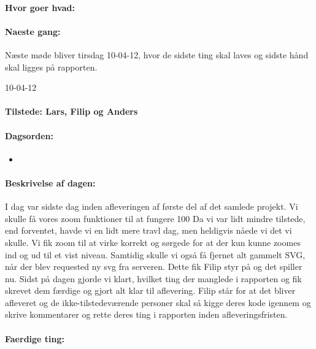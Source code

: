 \documentclass[a4paper,10pt,titlepage]{article}
\begin{document}
		\paragraph{Hvor goer hvad:}
		
		\paragraph{Naeste gang:}
		Næste møde bliver tirsdag 10-04-12, hvor de sidste ting skal laves og sidste hånd skal ligges på rapporten. \mbox{}\\ 
		
		\begin{center}
		10-04-12
		\end{center}
		
		\paragraph{Tilstede: Lars, Filip og Anders}
		\paragraph{Dagsorden:}
		\begin{itemize}
					\item 
					 
		\end{itemize}
		
		\paragraph{Beskrivelse af dagen:}
		I dag var sidste dag inden afleveringen af første del af det samlede projekt. Vi skulle få vores zoom funktioner til at fungere 100%
Da vi var lidt mindre tilstede, end forventet, havde vi en lidt mere travl dag, men heldigvis nåede vi det vi skulle. Vi fik zoom til at virke korrekt og sørgede for at der kun kunne zoomes ind og ud til et vist niveau. Samtidig skulle vi også få fjernet alt gammelt SVG, når der blev requested ny svg fra serveren. Dette fik Filip styr på og det spiller nu. Sidst på dagen gjorde vi klart, hvilket ting der manglede i rapporten og fik skrevet dem færdige og gjort alt klar til aflevering. Filip står for at det bliver afleveret og de ikke-tilstedeværende personer skal så kigge deres kode igennem og skrive kommentarer og rette deres ting i rapporten inden afleveringsfristen.

		\paragraph{Faerdige ting:}
		
\end{document}
